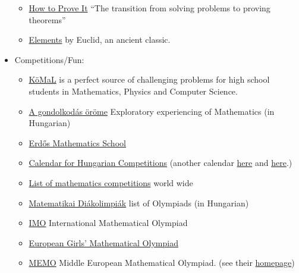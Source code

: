 \documentclass{article}
\begin{document}
\begin{itemize}
\begin{itemize}
        \item \href{https://www.goodreads.com/book/show/739735.How_to_Prove_It}{How to Prove It} ``The transition from solving problems to proving theorems''
    
        \item \href{http://farside.ph.utexas.edu/Books/Euclid/Elements.pdf}{Elements} by Euclid, an ancient classic.
    \end{itemize}
    
    \item Competitions/Fun:
    \begin{itemize}
        \item \href{https://www.komal.hu/home.e.shtml}{KöMaL} is a perfect source of challenging problems for high school students in Mathematics, Physics and Computer Science.
        
        \item \href{https://agondolkodasorome.hu/}{A gondolkodás öröme} Exploratory experiencing of Mathematics (in Hungarian)
        
        \item \href{https://erdosiskola.mik.uni-pannon.hu/}{Erdős Mathematics School}
        
        \item \href{https://agondolkodasorome.hu/versenynaptar/}{Calendar for Hungarian Competitions} (another calendar \href{https://matek.fazekas.hu/index.php?option=com_content&view=article&id=688:2023-2024-versenynaptar&catid=9&Itemid=119}{here} and \href{https://matek.berzsenyi.hu/versenynapt%C3%A1r}{here}.)
        
        \item \href{https://molympiad.wordpress.com/list-of-mathematics-competitions/}{List of mathematics competitions} world wide

        \item \href{https://www.bolyai.hu/versenyek-matematikai-diakolimpiak/}{Matematikai Diákolimpiák} list of Olympiads (in Hungarian)
        
        \item \href{https://www.imo-official.org/}{IMO} International Mathematical Olympiad
        
        \item \href{https://www.egmo.org/}{European Girls’ Mathematical Olympiad}
        
        \item \href{https://memo-official.org/MEMO/contests/previous/}{MEMO} Middle European Mathematical Olympiad. (see their \href{https://www.memo-official.org/}{homepage})
        

\end{itemize}
\end{itemize}
\end{document}
